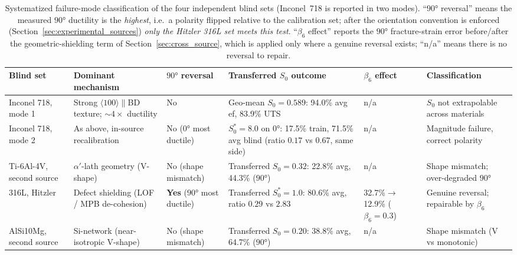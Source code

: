 \documentclass[12pt,a4paper,twocolumn]{article}
\begin{document}
\begin{table}[htbp]
\centering
\caption{Systematized failure-mode classification of the four independent blind sets (Inconel~718 is reported in two modes). ``$\ang{90}$ reversal'' means the measured $\ang{90}$ ductility is the \emph{highest}, i.e.\ a polarity flipped relative to the calibration set; after the orientation convention is enforced (Section~\ref{sec:experimental_sources}) \emph{only the Hitzler 316L set meets this test}. ``$\beta_6$ effect'' reports the $\ang{90}$ fracture-strain error before/after the geometric-shielding term of Section~\ref{sec:cross_source}, which is applied only where a genuine reversal exists; ``n/a'' means there is no reversal to repair.}
\label{tab:blind_failures}
\footnotesize
\setlength{\tabcolsep}{3pt}
\begin{tabular}{p{2.2cm}p{2.5cm}p{1.35cm}p{3.2cm}p{2.1cm}p{3.0cm}}
\toprule
\textbf{Blind set} & \textbf{Dominant mechanism} & \textbf{$\ang{90}$ reversal} & \textbf{Transferred $S_0$ outcome} & \textbf{$\beta_6$ effect} & \textbf{Classification} \\
\midrule
Inconel 718, mode 1 \cite{hovig2018in718} & Strong $\langle100\rangle\parallel$BD texture; $\sim4\times$ ductility & No & Geo-mean $S_0=0.589$: 94.0\% avg ef, 83.9\% UTS & n/a & $S_0$ not extrapolable across materials \\
Inconel 718, mode 2 \cite{hovig2018in718} & As above, in-source recalibration & No ($\ang{0}$ most ductile) & $S_0^*=8.0$ on $\ang{0}$: 17.5\% train, 71.5\% avg blind (ratio $0.17$ vs $0.67$, same side) & n/a & Magnitude failure, correct polarity \\
Ti-6Al-4V, second source \cite{sun2024ti64adem} & $\alpha'$-lath geometry (V-shape) & No (shape mismatch) & Transferred $S_0=0.32$: 22.8\% avg, 44.3\% ($\ang{90}$) & n/a & Shape mismatch; over-degraded $\ang{90}$ \\
316L, Hitzler \cite{hitzler2017materials} & Defect shielding (LOF / MPB de-cohesion) & \textbf{Yes} ($\ang{90}$ most ductile) & Transferred $S_0^*=1.0$: 80.6\% avg, ratio $0.29$ vs $2.83$ & 32.7\%$\to$12.9\% ($\beta_6{=}0.3$) & Genuine reversal; repairable by $\beta_6$ \\
AlSi10Mg, second source \cite{metals2018alsi_aniso} & Si-network (near-isotropic V-shape) & No (shape mismatch) & Transferred $S_0=0.20$: 38.8\% avg, 64.7\% ($\ang{90}$) & n/a & Shape mismatch (V vs monotonic) \\
\bottomrule
\end{tabular}
\end{table}
\end{document}
